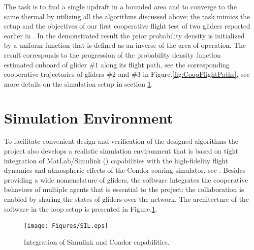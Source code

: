 \documentclass{ifacconf}
\newcommand{\squeezeup}{\vspace{-2.0mm}}
\begin{document}
The task is to find a single updraft in a bounded area and to converge to the
same thermal by utilizing all the algorithms discussed above; the task mimics
the setup and the objectives of our first cooperative flight test of two
gliders reported earlier in \cite{AKlass_JGCD:2012}. In the demonstrated
result the prior probability density is initialized by a uniform function
that is defined as an inverse of the area of operation. The result
corresponds to the progression of the probability density function estimated
onboard of glider $\#1$ along its flight path, see the corresponding
cooperative trajectories of gliders $\#2$ and $\#3$ in
Figure.\ref{fig:CoopFlightPaths}, see more details on the simulation setup in
section \ref{sec:SimEnv}.

\section{Simulation Environment}
\label{sec:SimEnv}
\squeezeup

To facilitate convenient design and verification of the designed algorithms
the project also develops a realistic simulation environment that is based on
tight integration of MatLab/Simulink (\cite{MATLAB:2013}) capabilities with
the high-fidelity flight dynamics and atmospheric effects of the Condor
soaring simulator, see \cite{Condor:2013:Online}. Besides providing a wide
nomenclature of gliders, the software integrates the cooperative behaviors of
multiple agents that is essential to the project; the collaboration is
enabled by sharing the states of gliders over the network. The architecture
of the software in the loop setup is presented in Figure.\ref{fig:SIL}.
%

\begin{figure}[thpb]
  \centering
  \texttt{[image: Figures/SIL.eps]}
  \caption{Integration of Simulink and Condor capabilities.}
  \label{fig:SIL}
\end{figure}
\end{document}

